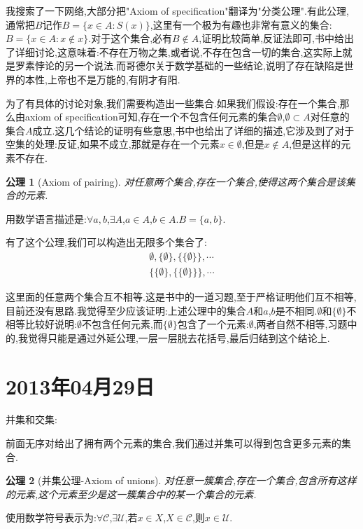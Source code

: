 \documentclass[12pt,a4paper,openany]{book}
\newtheorem{axiom}{公理}[section]
\begin{document}
我搜索了一下网络,大部分把"Axiom of specification"翻译为"分类公理".有此公理,通常把$B$记作$B=\{x \in A: S(x)\}$,这里有一个极为有趣也非常有意义的集合:$B=\{x \in A: x \notin x\}$.对于这个集合,必有$B \notin A$,证明比较简单,反证法即可,书中给出了详细讨论,这意味着:不存在万物之集,或者说,不存在包含一切的集合,这实际上就是罗素悖论的另一个说法.而哥德尔关于数学基础的一些结论,说明了存在缺陷是世界的本性,上帝也不是万能的,有阴才有阳.

为了有具体的讨论对象,我们需要构造出一些集合.如果我们假设:存在一个集合,那么由axiom of specification可知,存在一个不包含任何元素的集合$\emptyset$,$\emptyset \subset A$对任意的集合$A$成立.这几个结论的证明有些意思,书中也给出了详细的描述,它涉及到了对于空集的处理:反证,如果不成立,那就是存在一个元素$x \in \emptyset$,但是$x \notin A$,但是这样的元素不存在.

\begin{axiom}[Axiom of pairing]
对任意两个集合,存在一个集合,使得这两个集合是该集合的元素.
\end{axiom}

用数学语言描述是:$\forall a,b$,$\exists A$,$a \in A$,$b \in A$.$B=\{a,b\}$.

有了这个公理,我们可以构造出无限多个集合了:
\begin{gather*}
\emptyset,\{\emptyset\},\{\{\emptyset\}\},\cdots\\
\{\{\emptyset\},\{\{\emptyset\}\}\},\cdots
\end{gather*}

这里面的任意两个集合互不相等.这是书中的一道习题,至于严格证明他们互不相等,目前还没有思路.我觉得至少应该证明:上述公理中的集合$A$和$a$,$b$是不相同.$\emptyset$和$\{\emptyset\}$不相等比较好说明:$\emptyset$不包含任何元素,而$\{\emptyset\}$包含了一个元素:$\emptyset$,两者自然不相等,习题中的,我觉得只能是通过外延公理,一层一层脱去花括号,最后归结到这个结论上.

\section{2013年04月29日}
并集和交集:

前面无序对给出了拥有两个元素的集合,我们通过并集可以得到包含更多元素的集合.

\begin{axiom}[并集公理-Axiom of unions]
对任意一簇集合,存在一个集合,包含所有这样的元素,这个元素至少是这一簇集合中的某一个集合的元素.
\end{axiom}

使用数学符号表示为:$\forall \mathscr{C}$,$\exists \mathscr{U}$,若$x \in X$,$X \in \mathscr{C}$,则$x \in \mathscr{U}$.
\end{document}
